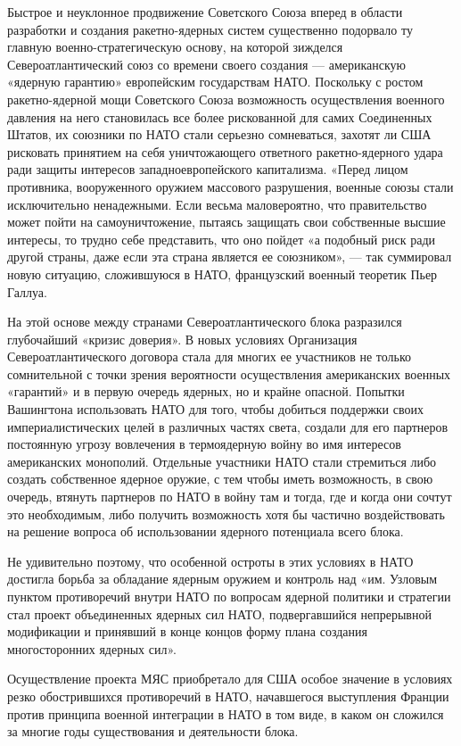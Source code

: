 \documentclass[12pt, a4paper, openany]{book}
\begin{document}
		Быстрое и неуклонное продвижение Советского Союза вперед в области разработки и создания ракетно-ядерных систем существенно подорвало ту главную военно-стратегическую основу, на которой зижделся Североатлантический союз со времени своего создания — американскую «ядерную гарантию» европейским государствам НАТО. Поскольку с ростом ракетно-ядерной мощи Советского Союза возможность осуществления военного давления на него становилась все более рискованной для самих Соединенных Штатов, их союзники по НАТО стали серьезно сомневаться, захотят ли США рисковать принятием на себя уничтожающего ответного ракетно-ядерного удара ради защиты интересов западноевропейского капитализма. «Перед лицом противника, вооруженного оружием массового разрушения, военные союзы стали исключительно ненадежными. Если весьма маловероятно, что правительство может пойти на самоуничтожение, пытаясь защищать свои собственные высшие интересы, то трудно себе представить, что оно пойдет «а подобный риск ради другой страны, даже если эта страна является ее союзником», — так суммировал новую ситуацию, сложившуюся в НАТО, французский военный теоретик Пьер Галлуа.
		
		На этой основе между странами Североатлантического блока разразился глубочайший «кризис доверия». В новых условиях Организация Североатлантического договора стала для многих ее участников не только сомнительной с точки зрения вероятности осуществления американских военных «гарантий» и в первую очередь ядерных, но и крайне опасной. Попытки Вашингтона использовать НАТО для того, чтобы добиться поддержки своих империалистических целей в различных частях света, создали для его партнеров постоянную угрозу вовлечения в термоядерную войну во имя интересов американских монополий. Отдельные участники НАТО стали стремиться либо создать собственное ядерное оружие, с тем чтобы иметь возможность, в свою очередь, втянуть партнеров по НАТО в войну там и тогда, где и когда они сочтут это необходимым, либо получить возможность хотя бы частично воздействовать на решение вопроса об использовании ядерного потенциала всего блока.
		
		Не удивительно поэтому, что особенной остроты в этих условиях в НАТО достигла борьба за обладание ядерным оружием и контроль над «им. Узловым пунктом противоречий внутри НАТО по вопросам ядерной политики и стратегии стал проект объединенных ядерных сил НАТО, подвергавшийся непрерывной модификации и принявший в конце концов форму плана создания многосторонних ядерных сил».
		
		Осуществление проекта МЯС приобретало для США особое значение в условиях резко обострившихся противоречий в НАТО, начавшегося выступления Франции против принципа военной интеграции в НАТО в том виде, в каком он сложился за многие годы существования и деятельности блока.
		
\end{document}
